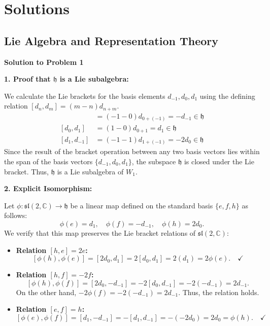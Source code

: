 \documentclass{article}
\newcommand{\slC}{\mathfrak{sl}(2, \mathbb{C})}
\begin{document}
\section{Solutions}

\subsection{Lie Algebra and Representation Theory}

\textbf{Solution to Problem 1}

\textbf{1. Proof that $\mathfrak{h}$ is a Lie subalgebra:}

We calculate the Lie brackets for the basis elements $d_{-1}, d_0, d_1$ using the defining relation $[d_n, d_m] = (m-n)d_{n+m}$.
\begin{align*}
    [d_0, d_{-1}] &= (-1 - 0)d_{0+(-1)} = -d_{-1} \in \mathfrak{h} \\
    [d_0, d_1] &= (1 - 0)d_{0+1} = d_1 \in \mathfrak{h} \\
    [d_1, d_{-1}] &= (-1 - 1)d_{1+(-1)} = -2d_0 \in \mathfrak{h}
\end{align*}
Since the result of the bracket operation between any two basis vectors lies within the span of the basis vectors $\{d_{-1}, d_0, d_1\}$, the subspace $\mathfrak{h}$ is closed under the Lie bracket. Thus, $\mathfrak{h}$ is a Lie subalgebra of $W_1$.

\vspace{0.5cm}

\textbf{2. Explicit Isomorphism:}

Let $\phi: \slC \to \mathfrak{h}$ be a linear map defined on the standard basis $\{e, f, h\}$ as follows:
\[
\phi(e) = d_1, \quad \phi(f) = -d_{-1}, \quad \phi(h) = 2d_0.
\]
We verify that this map preserves the Lie bracket relations of $\slC$:

\begin{itemize}
    \item \textbf{Relation $[h, e] = 2e$:}
    \[ [\phi(h), \phi(e)] = [2d_0, d_1] = 2[d_0, d_1] = 2(d_1) = 2\phi(e). \quad \checkmark \]

    \item \textbf{Relation $[h, f] = -2f$:}
    \[ [\phi(h), \phi(f)] = [2d_0, -d_{-1}] = -2[d_0, d_{-1}] = -2(-d_{-1}) = 2d_{-1}. \]
    On the other hand, $-2\phi(f) = -2(-d_{-1}) = 2d_{-1}$. Thus, the relation holds. \quad \checkmark

    \item \textbf{Relation $[e, f] = h$:}
    \[ [\phi(e), \phi(f)] = [d_1, -d_{-1}] = -[d_1, d_{-1}] = -(-2d_0) = 2d_0 = \phi(h). \quad \checkmark \]
\end{itemize}
\end{document}
